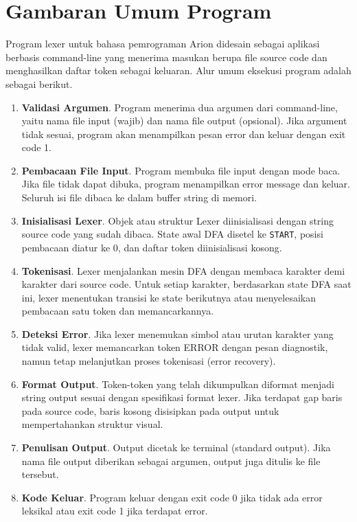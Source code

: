 \section{Gambaran Umum Program}

Program lexer untuk bahasa pemrograman Arion didesain sebagai aplikasi berbasis command-line yang menerima masukan berupa file source code dan menghasilkan daftar token sebagai keluaran. Alur umum eksekusi program adalah sebagai berikut.

\begin{enumerate}
    \item \textbf{Validasi Argumen}. Program menerima dua argumen dari command-line, yaitu nama file input (wajib) dan nama file output (opsional). Jika argument tidak sesuai, program akan menampilkan pesan error dan keluar dengan exit code 1.

    \item \textbf{Pembacaan File Input}. Program membuka file input dengan mode baca. Jika file tidak dapat dibuka, program menampilkan error message dan keluar. Seluruh isi file dibaca ke dalam buffer string di memori.

    \item \textbf{Inisialisasi Lexer}. Objek atau struktur Lexer diinisialisasi dengan string source code yang sudah dibaca. State awal DFA disetel ke \texttt{START}, posisi pembacaan diatur ke 0, dan daftar token diinisialisasi kosong.

    \item \textbf{Tokenisasi}. Lexer menjalankan mesin DFA dengan membaca karakter demi karakter dari source code. Untuk setiap karakter, berdasarkan state DFA saat ini, lexer menentukan transisi ke state berikutnya atau menyelesaikan pembacaan satu token dan memancarkannya.

    \item \textbf{Deteksi Error}. Jika lexer menemukan simbol atau urutan karakter yang tidak valid, lexer memancarkan token ERROR dengan pesan diagnostik, namun tetap melanjutkan proses tokenisasi (error recovery).

    \item \textbf{Format Output}. Token-token yang telah dikumpulkan diformat menjadi string output sesuai dengan spesifikasi format lexer. Jika terdapat gap baris pada source code, baris kosong disisipkan pada output untuk mempertahankan struktur visual.

    \item \textbf{Penulisan Output}. Output dicetak ke terminal (standard output). Jika nama file output diberikan sebagai argumen, output juga ditulis ke file tersebut.

    \item \textbf{Kode Keluar}. Program keluar dengan exit code 0 jika tidak ada error leksikal atau exit code 1 jika terdapat error.
\end{enumerate}

